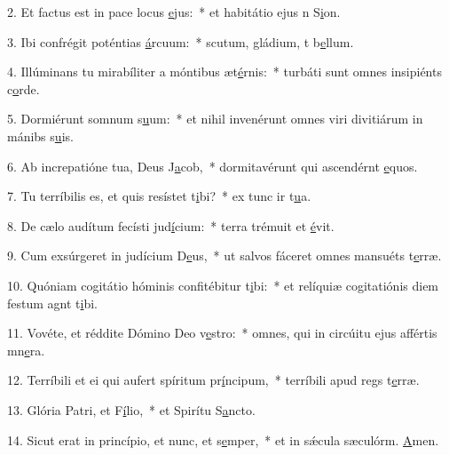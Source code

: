 2. Et factus est in pace locus \uline{e}jus:~* et habitátio ejus n S\uline{i}on.\par 
3. Ibi confrégit poténtias \uline{á}rcuum:~* scutum, gládium, t b\uline{e}llum.\par 
4. Illúminans tu mirabíliter a móntibus æt\uline{é}rnis:~* turbáti sunt omnes insipiénts c\uline{o}rde.\par 
5. Dormiérunt somnum s\uline{u}um:~* et nihil invenérunt omnes viri divitiárum in mánibs s\uline{u}is.\par 
6. Ab increpatióne tua, Deus J\uline{a}cob,~* dormitavérunt qui ascendérnt \uline{e}quos.\par 
7. Tu terríbilis es, et quis resístet t\uline{i}bi?~* ex tunc ir t\uline{u}a.\par 
8. De cælo audítum fecísti jud\uline{í}cium:~* terra trémuit et \uline{é}vit.\par 
9. Cum exsúrgeret in judícium D\uline{e}us,~* ut salvos fáceret omnes mansuéts t\uline{e}rræ.\par 
10. Quóniam cogitátio hóminis confitébitur t\uline{i}bi:~* et relíquiæ cogitatiónis diem festum agnt t\uline{i}bi.\par 
11. Vovéte, et réddite Dómino Deo v\uline{e}stro:~* omnes, qui in circúitu ejus affértis mn\uline{e}ra.\par 
12. Terríbili et ei qui aufert spíritum pr\uline{í}ncipum,~* terríbili apud regs t\uline{e}rræ.\par 
13. Glória Patri, et F\uline{í}lio,~* et Spirítu S\uline{a}ncto.\par 
14. Sicut erat in princípio, et nunc, et s\uline{e}mper,~* et in sǽcula sæculórm. \uline{A}men.\par 
